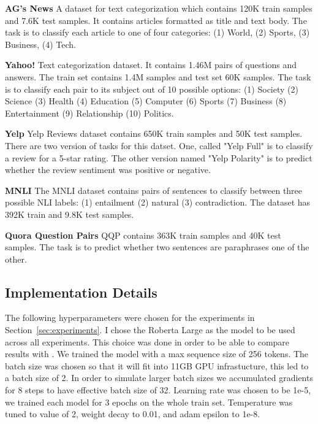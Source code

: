 \documentclass[11pt,a4paper]{article}
\begin{document}
\vspace{8pt}
\noindent \textbf{AG's News} \quad
A dataset for text categorization which contains 120K train samples and 7.6K test samples.
It contains articles formatted as title and text body.
The task is to classify each article to one of four categories: (1) World, (2) Sports, (3) Business, (4) Tech.

\vspace{8pt}
\noindent \textbf{Yahoo!} \quad
Text categorization dataset. It contains 1.46M pairs of questions and answers.
The train set contains 1.4M samples and test set 60K samples.
The task is to classify each pair to its subject out of 10 possible options: (1) Society (2) Science (3) Health (4) Education (5) Computer (6) Sports (7) Business (8) Entertainment (9) Relationship (10) Politics.

\vspace{8pt}
\noindent \textbf{Yelp} \quad
Yelp Reviews dataset contains 650K train samples and 50K test samples.
There are two version of tasks for this datset.
One, called "Yelp Full" is to classify a review for a 5-star rating.
The other version named "Yelp Polarity" is to predict whether the review sentiment was positive or negative.

\vspace{8pt}
\noindent \textbf{MNLI} \quad
The MNLI dataset contains pairs of sentences to classify between three possible NLI labels: (1) entailment (2) natural (3) contradiction. 
The dataset has 392K train and 9.8K test samples.

\vspace{8pt}
\noindent \textbf{Quora Question Pairs} \quad
QQP contains 363K train samples and 40K test samples.
The task is to predict whether two sentences are paraphrases one of the other.

\subsection{Implementation Details}
\label{apx:implementation-details}
The following hyperparameters were chosen for the experiments in Section~\ref{sec:experiments}.
I chose the Roberta Large as the model to be used across all experiments.
This choice was done in order to be able to compare results with \citet{schick2020exploiting}.
We trained the model with a max sequence size of 256 tokens.
The batch size was chosen so that it will fit into 11GB GPU infrastucture, this led to a batch size of 2. 
In order to simulate larger batch sizes we accumulated gradients for 8 steps to have effective batch size of 32.
Learning rate was chosen to be 1e-5, we trained each model for 3 epochs on the whole train set.
Temperature was tuned to value of 2, weight decay to 0.01, and adam epsilon to 1e-8.
\end{document}

